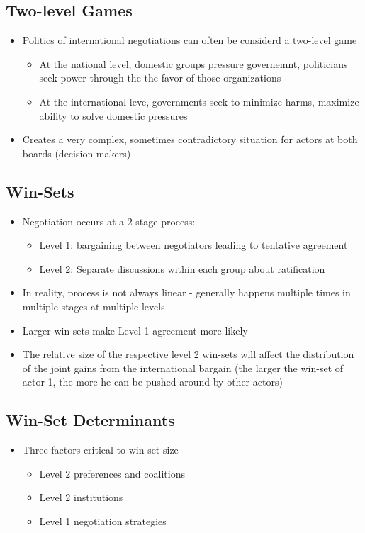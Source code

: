 \documentclass[11pt]{article}
\begin{document}
\subsection{Two-level Games}
\label{sec:org94ecb41}
\begin{itemize}
\item Politics of international negotiations can often be considerd a two-level game
\begin{itemize}
\item At the national level, domestic groups pressure governemnt, politicians seek power through the the favor of those organizations
\item At the international leve, governments seek to minimize harms, maximize ability to solve domestic pressures
\end{itemize}
\item Creates a very complex, sometimes contradictory situation for actors at both boards (decision-makers)
\end{itemize}
\subsection{Win-Sets}
\label{sec:orga264bed}
\begin{itemize}
\item Negotiation occurs at a 2-stage process:
\begin{itemize}
\item Level 1: bargaining between negotiators leading to tentative agreement
\item Level 2: Separate discussions within each group about ratification
\end{itemize}
\item In reality, process is not always linear - generally happens multiple times in multiple stages at multiple levels
\item Larger win-sets make Level 1 agreement more likely
\item The relative size of the respective level 2 win-sets will affect the distribution of the joint gains from the international bargain (the larger the win-set of actor 1, the more he can be pushed around by other actors)
\end{itemize}
\subsection{Win-Set Determinants}
\label{sec:org5a0f9ee}
\begin{itemize}
\item Three factors critical to win-set size
\begin{itemize}
\item Level 2 preferences and coalitions
\item Level 2 institutions
\item Level 1 negotiation strategies
\end{itemize}
\end{itemize}
\end{document}
